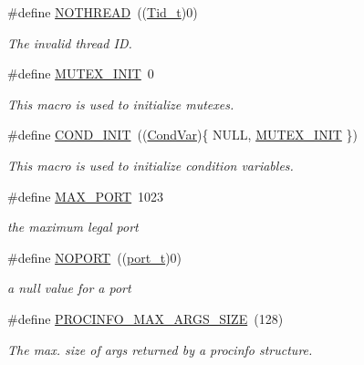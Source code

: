 \begin{DoxyCompactItemize}
\#define \hyperlink{group__syscalls_ga00ccfb785dd0b09ec7091fc213c2f491}{N\+O\+T\+H\+R\+E\+AD}~((\hyperlink{group__syscalls_gaf67ad1c55e6b2a79bf8a99106380ce01}{Tid\+\_\+t})0)
\begin{DoxyCompactList}\small\item\em The invalid thread ID. \end{DoxyCompactList}\item 
\#define \hyperlink{group__syscalls_ga96be0bfc33e7e113099c7546798bec99}{M\+U\+T\+E\+X\+\_\+\+I\+N\+IT}~0
\begin{DoxyCompactList}\small\item\em This macro is used to initialize mutexes. \end{DoxyCompactList}\item 
\#define \hyperlink{group__syscalls_ga6a7055a466bff255172e05f6ec82d792}{C\+O\+N\+D\+\_\+\+I\+N\+IT}~((\hyperlink{structCondVar}{Cond\+Var})\{ N\+U\+LL, \hyperlink{group__syscalls_ga96be0bfc33e7e113099c7546798bec99}{M\+U\+T\+E\+X\+\_\+\+I\+N\+IT} \})
\begin{DoxyCompactList}\small\item\em This macro is used to initialize condition variables. \end{DoxyCompactList}\item 
\mbox{\label{group__syscalls_ga401e1a60d6381236216b6a130a6685bd}} 
\#define \hyperlink{group__syscalls_ga401e1a60d6381236216b6a130a6685bd}{M\+A\+X\+\_\+\+P\+O\+RT}~1023
\begin{DoxyCompactList}\small\item\em the maximum legal port \end{DoxyCompactList}\item 
\mbox{\label{group__syscalls_gab71912b8841547d43a65ad40d730acd5}} 
\#define \hyperlink{group__syscalls_gab71912b8841547d43a65ad40d730acd5}{N\+O\+P\+O\+RT}~((\hyperlink{group__syscalls_ga13894e5a2ffd5febb7aeb90e87239d61}{port\+\_\+t})0)
\begin{DoxyCompactList}\small\item\em a null value for a port \end{DoxyCompactList}\item 
\mbox{\label{group__syscalls_ga657ad9e9d81dcca25fb225cf99051e0d}} 
\#define \hyperlink{group__syscalls_ga657ad9e9d81dcca25fb225cf99051e0d}{P\+R\+O\+C\+I\+N\+F\+O\+\_\+\+M\+A\+X\+\_\+\+A\+R\+G\+S\+\_\+\+S\+I\+ZE}~(128)
\begin{DoxyCompactList}\small\item\em The max. size of args returned by a procinfo structure. \end{DoxyCompactList}\end{DoxyCompactItemize}
